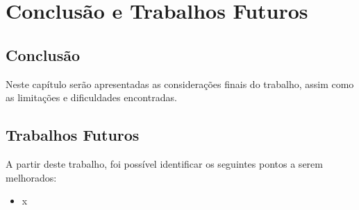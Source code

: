\chapter{Conclusão e Trabalhos Futuros}

\section*{Conclusão}

Neste capítulo serão apresentadas as considerações finais do trabalho, assim como
as limitações e dificuldades encontradas.

\section*{Trabalhos Futuros}

A partir deste trabalho, foi possível identificar os seguintes pontos a serem melhorados:
\begin{itemize}
 \item x
\end{itemize}
